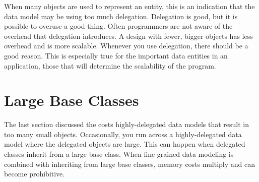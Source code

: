 When many objects are used to represent an entity, this is an indication that the data model may be using too much delegation. Delegation is good, but it is possible to overuse a good thing. Often programmers are not aware of the overhead that delegation introduces. A design with fewer, bigger objects has less overhead and is more scalable. Whenever you use delegation, there should be a good reason. This is especially true for the important data entities in an application, those that will determine the scalability of the program.  
 
\section{Large Base Classes}

The last section discussed the costs highly-delegated data models that result in too many small objects. Occasionally, you run across a highly-delegated data model where the delegated objects are large. This can happen when delegated classes inherit from a large base class. When fine grained data modeling is combined with inheriting from large base classes, memory costs multiply and can become prohibitive. 

